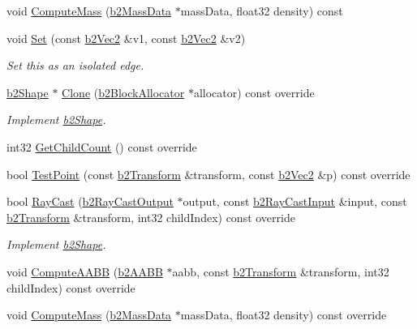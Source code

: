 \begin{DoxyCompactItemize}
\item 
void \hyperlink{classb2EdgeShape_a1cd695882766566f76bb0fedf346407d}{Compute\+Mass} (\hyperlink{structb2MassData}{b2\+Mass\+Data} $\ast$mass\+Data, float32 density) const
\item 
\mbox{\label{classb2EdgeShape_a67dd3b17630a600033cb4380697a4e9d}} 
void \hyperlink{classb2EdgeShape_a67dd3b17630a600033cb4380697a4e9d}{Set} (const \hyperlink{structb2Vec2}{b2\+Vec2} \&v1, const \hyperlink{structb2Vec2}{b2\+Vec2} \&v2)
\begin{DoxyCompactList}\small\item\em Set this as an isolated edge. \end{DoxyCompactList}\item 
\mbox{\label{classb2EdgeShape_a99fd092e0f3a4074ad1fba1fa6023451}} 
\hyperlink{classb2Shape}{b2\+Shape} $\ast$ \hyperlink{classb2EdgeShape_a99fd092e0f3a4074ad1fba1fa6023451}{Clone} (\hyperlink{classb2BlockAllocator}{b2\+Block\+Allocator} $\ast$allocator) const override
\begin{DoxyCompactList}\small\item\em Implement \hyperlink{classb2Shape}{b2\+Shape}. \end{DoxyCompactList}\item 
int32 \hyperlink{classb2EdgeShape_ae9dcaa2f4b77fcf182d29159658da82a}{Get\+Child\+Count} () const override
\item 
bool \hyperlink{classb2EdgeShape_a15151673cf9ad585779c70363425f470}{Test\+Point} (const \hyperlink{structb2Transform}{b2\+Transform} \&transform, const \hyperlink{structb2Vec2}{b2\+Vec2} \&p) const override
\item 
\mbox{\label{classb2EdgeShape_a192cf10bd556a5a90b29a2bcee2ddd75}} 
bool \hyperlink{classb2EdgeShape_a192cf10bd556a5a90b29a2bcee2ddd75}{Ray\+Cast} (\hyperlink{structb2RayCastOutput}{b2\+Ray\+Cast\+Output} $\ast$output, const \hyperlink{structb2RayCastInput}{b2\+Ray\+Cast\+Input} \&input, const \hyperlink{structb2Transform}{b2\+Transform} \&transform, int32 child\+Index) const override
\begin{DoxyCompactList}\small\item\em Implement \hyperlink{classb2Shape}{b2\+Shape}. \end{DoxyCompactList}\item 
void \hyperlink{classb2EdgeShape_a238139ae1736b457d77443133ff16854}{Compute\+A\+A\+BB} (\hyperlink{structb2AABB}{b2\+A\+A\+BB} $\ast$aabb, const \hyperlink{structb2Transform}{b2\+Transform} \&transform, int32 child\+Index) const override
\item 
void \hyperlink{classb2EdgeShape_ac738c1e0ab2f4dfbab26e3942efa60af}{Compute\+Mass} (\hyperlink{structb2MassData}{b2\+Mass\+Data} $\ast$mass\+Data, float32 density) const override
\end{DoxyCompactItemize}
